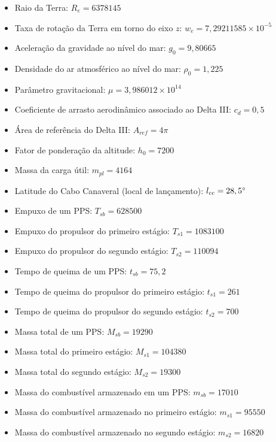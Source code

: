\begin{itemize}
	\item Raio da Terra: $ R_e = 6378145 $ 
	\item Taxa de rotação da Terra em torno do eixo $ z $: $ w_e = 7,29211585 \times 10^{-5} $ 
	\item Aceleração da gravidade ao nível do mar: $ g_0 = 9,80665 $ 
	\item Densidade do ar atmosférico ao nível do mar: $ \rho_0 = 1,225 $ 
	\item Parâmetro gravitacional: $ \mu = 3,986012 \times 10^{14} $ 
	\item Coeficiente de arrasto aerodinâmico associado ao Delta III: $ c_d = 0,5 $ 
	\item Área de referência do Delta III: $ A_{ref} = 4 \pi $ 
	\item Fator de ponderação da altitude: $ h_0 = 7200 $ 
	\item Massa da carga útil: $ m_{pl} = 4164$ 
	\item Latitude do Cabo Canaveral (local de lançamento):  $l_{cc} = 28,5 \degree $
	\item Empuxo de um PPS: $ T_{sb} = 628500 $ 
	\item Empuxo do propulsor do primeiro estágio: $ T_{s1} = 1083100 $ 
	\item Empuxo do propulsor do segundo estágio: $ T_{s2} = 110094 $ 
	\item Tempo de queima de um PPS: $ t_{sb} = 75,2 $ 
	\item Tempo de queima do propulsor do primeiro estágio: $ t_{s1} = 261 $ 
	\item Tempo de queima do propulsor do segundo estágio: $ t_{s2} = 700 $ 
	\item Massa total de um PPS: $ M_{sb} = 19290 $ 
	\item Massa total do primeiro estágio: $ M_{s1} = 104380 $ 
	\item Massa total do segundo estágio: $ M_{s2} = 19300 $ 
	\item Massa do combustível armazenado em um PPS: $ m_{sb} = 17010 $ 
	\item Massa do combustível armazenado no primeiro estágio: $ m_{s1} = 95550 $ 
	\item Massa do combustível armazenado no segundo estágio: $ m_{s2} = 16820 $ 

\end{itemize}
